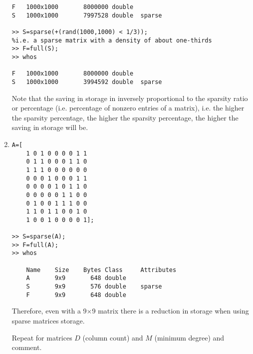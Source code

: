\begin{enumerate}
\begin{lstlisting}
F   1000x1000       8000000 double
S   1000x1000       7997528 double  sparse

>> S=sparse(+(rand(1000,1000) < 1/3));
%i.e. a sparse matrix with a density of about one-thirds
>> F=full(S);
>> whos

F   1000x1000       8000000 double
S   1000x1000       3994592 double  sparse
    \end{lstlisting}
    Note that the saving in storage in inversely proportional to the sparsity
    ratio or percentage (i.e. percentage of nonzero entries of a matrix),
    i.e. the higher the sparsity percentage, the higher the sparsity percentage,
    the higher the saving in storage will be.

\newpage
\item
    \begin{lstlisting}
A=[
    1 0 1 0 0 0 0 1 1
    0 1 1 0 0 0 1 1 0
    1 1 1 0 0 0 0 0 0
    0 0 0 1 0 0 0 1 1
    0 0 0 0 1 0 1 1 0
    0 0 0 0 0 1 1 0 0
    0 1 0 0 1 1 1 0 0
    1 1 0 1 1 0 0 1 0
    1 0 0 1 0 0 0 0 1];

>> S=sparse(A);
>> F=full(A);
>> whos

    Name    Size    Bytes Class     Attributes
    A       9x9       648 double
    S       9x9       576 double    sparse
    F       9x9       648 double
    \end{lstlisting}
    Therefore, even with a 9$\times$9 matrix there is a reduction in storage
    when using sparse matrices storage.

    Repeat for matrices $D$ (column count) and $M$ (minimum degree) and comment.
\end{enumerate}

\vfill

